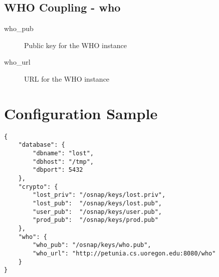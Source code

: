 \subsection*{WHO Coupling - who}
\begin{description}
\item[who\_pub]  Public key for the WHO instance
\item[who\_url]  URL for the WHO instance
\end{description}

\section*{Configuration Sample}
\begin{verbatim}
{
    "database": {
        "dbname": "lost",
        "dbhost": "/tmp",
        "dbport": 5432
    },
    "crypto": {
        "lost_priv": "/osnap/keys/lost.priv",
        "lost_pub":  "/osnap/keys/lost.pub",
        "user_pub":  "/osnap/keys/user.pub",
        "prod_pub":  "/osnap/keys/prod.pub"
    },
    "who": {
        "who_pub": "/osnap/keys/who.pub",
        "who_url": "http://petunia.cs.uoregon.edu:8080/who"
    }
}
\end{verbatim}